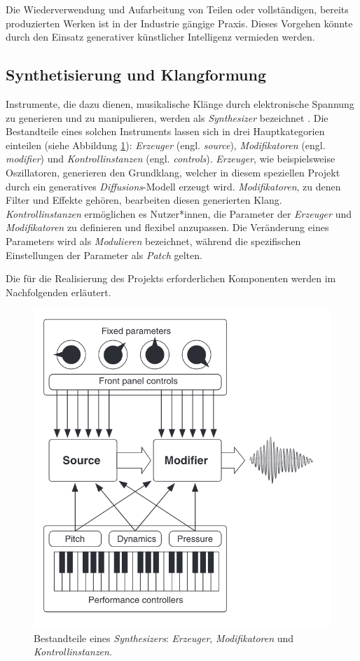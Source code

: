 \documentclass[
  a4paper,  %
  twoside,  %
  bibliography=totoc,
  headsepline,
  cleardoublepage=empty,
  parskip=half,
  draft=false
]{scrbook}
\begin{document}
Die Wiederverwendung und Aufarbeitung von Teilen oder vollständigen, bereits produzierten Werken ist in der Industrie gängige Praxis. Dieses Vorgehen könnte durch den Einsatz generativer künstlicher Intelligenz vermieden werden.

\subsection{Synthetisierung und Klangformung} \label{sec:synth+envelope}

Instrumente, die dazu dienen, musikalische Klänge durch elektronische Spannung zu generieren und zu manipulieren, werden als \emph{Synthesizer} bezeichnet \cite{dudenredaktion_synthesizer_nodate, pirkle_designing_2021}. Die Bestandteile eines solchen Instruments lassen sich in drei Hauptkategorien einteilen (siehe Abbildung \ref{fig:synth}): \emph{Erzeuger} (engl. \emph{source}), \emph{Modifikatoren} (engl. \emph{modifier}) und \emph{Kontrollinstanzen} (engl. \emph{controls}). \emph{Erzeuger}, wie beispielsweise Oszillatoren, generieren den Grundklang, welcher in diesem speziellen Projekt durch ein generatives \emph{Diffusions}-Modell erzeugt wird. \emph{Modifikatoren}, zu denen Filter und Effekte gehören, bearbeiten diesen generierten Klang. \emph{Kontrollinstanzen} ermöglichen es Nutzer*innen, die Parameter der \emph{Erzeuger} und \emph{Modifikatoren} zu definieren und flexibel anzupassen. Die Veränderung eines Parameters wird als \emph{Modulieren} bezeichnet, während die spezifischen Einstellungen der Parameter als \emph{Patch} gelten. \cite{pirkle_designing_2021}   

Die für die Realisierung des Projekts erforderlichen Komponenten werden im Nachfolgenden erläutert.

\begin{figure}[h]
  \centering
  \includegraphics[width=.5\textwidth]{graphics/synthstruc.png}
  \caption[Synth]{Bestandteile eines \emph{Synthesizers}: \emph{Erzeuger}, \emph{Modifikatoren} und \emph{Kontrollinstanzen}. \cite{russ_sound_2009}}
  \label{fig:synth}
\end{figure}
\end{document}
